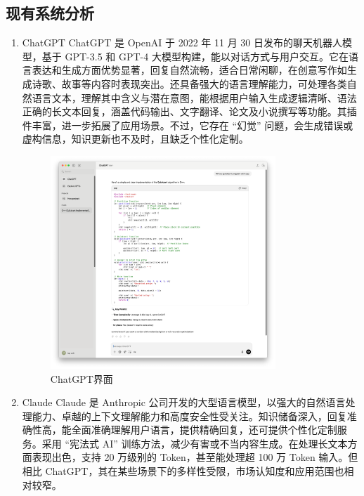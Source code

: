\documentclass[
    report,     %
    oneside,    %
    UTF8,       %
    zihao=-4    %
]{config} %
\begin{document}
\subsection{现有系统分析}
\begin{enumerate}[label=(\arabic*)]
    \item ChatGPT
ChatGPT 是 OpenAI 于 2022 年 11 月 30 日发布的聊天机器人模型，基于 GPT-3.5 和 GPT-4 大模型构建，能以对话方式与用户交互。它在语言表达和生成方面优势显著，回复自然流畅，适合日常闲聊，在创意写作如生成诗歌、故事等内容时表现突出。还具备强大的语言理解能力，可处理各类自然语言文本，理解其中含义与潜在意图，能根据用户输入生成逻辑清晰、语法正确的长文本回复，涵盖代码输出、文字翻译、论文及小说撰写等功能。其插件丰富，进一步拓展了应用场景。不过，它存在 “幻觉” 问题，会生成错误或虚构信息，知识更新也不及时，且缺乏个性化定制。
\begin{figure}[h] %
    \centering %
    \includegraphics[width=0.8\textwidth]{figures/chatgpt.pdf}
    \caption{ChatGPT界面} %
    \label{fig:ChatGPT} %
\end{figure}
    \item Claude
Claude 是 Anthropic 公司开发的大型语言模型，以强大的自然语言处理能力、卓越的上下文理解能力和高度安全性受关注。知识储备深入，回复准确性高，能全面准确理解用户语言，提供精确回复，还可提供个性化定制服务。采用 “宪法式 AI” 训练方法，减少有害或不当内容生成。在处理长文本方面表现出色，支持 20 万级别的 Token，甚至能处理超 100 万 Token 输入。但相比 ChatGPT，其在某些场景下的多样性受限，市场认知度和应用范围也相对较窄。
\begin{figure}[h] %

\end{figure}
\end{enumerate}
\end{document}
